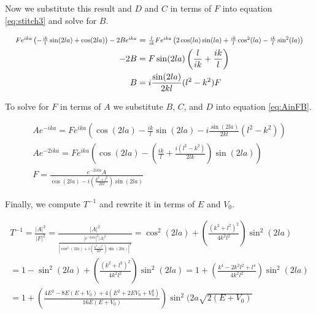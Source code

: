 Now we substitute this result and $D$ and $C$ in terms of $F$ into equation
\eqref{eq:stitch3} and solve for $B$.

\begin{align*}
    \scalebox{0.8}{$
    Fe^{ika}
    \left(
    -\frac{ik}{l}\sin(2la) + \cos(2la)
    \right)
    - 2Be^{ika}
    $}
    &=
    \scalebox{0.8}{$
    \frac{l}{ik}Fe^{ika}
    \left(
    2\cos(la)\sin(la) + \frac{ik}{l}\cos^2(la) - \frac{ik}{l}\sin^2(la)
    \right)
    $}
    \\
    -2B &= F\sin(2la)
    \left(
    \frac{l}{ik} + \frac{ik}{l}
    \right)
    \\
    B &= i\frac{\sin(2la)}{2kl}(l^2 - k^2)F
\end{align*}

To solve for $F$ in terms of $A$ we substitute $B$, $C$, and $D$ into
equation \eqref{eq:AinFB}.

\begin{gather*}
    Ae^{-ika}
    = Fe^{ika}
    \left(
    \cos(2la) - \frac{ik}{l}\sin(2la)
    - i\frac{\sin(2la)}{2kl}(l^2 - k^2)
    \right)
    \\
    Ae^{-2ika}
    = Fe^{ika}
    \left(
    \cos(2la) -
    \left(
    \frac{ik}{l} + \frac{i(l^2 - k^2)}{2lk}
    \right)
    \sin(2la)
    \right)
    \\
    F = \frac{e^{-2ika}A}{\cos(2la) - i
    \left(
    \frac{k^2 + l^2}{2kl}
    \right)
    \sin(2la)}
\end{gather*}

Finally, we compute $T^{-1}$ and rewrite it in terms of $E$ and $V_0$.

\begin{gather*}
    T^{-1} = \frac{\left| A \right| ^{2}}{\left| F \right| ^{2}}
    = \frac{\left| A \right| ^{2}}{
        \frac{\left| e^{-2ika} \right| ^2 \left| A \right | ^2}{
                \left|
                \cos^2(2la) + i \left( \frac{k^2 + l^2}{2kl} \right)
                \sin(2la)
                \right| ^2
            }
        }
    = \cos^2(2la) + \left( \frac{(k^2 + l^2)^2}{4k^2l^2} \right) \sin^2(2la)
    \\
    = 1 - \sin^2(2la) + \left( \frac{(k^2 + l^2)^2}{4k^2l^2}
    \right) \sin^2(2la)
    = 1 + \left( \frac{k^4 - 2k^2l^2 + l^4}{4k^2l^2} \right) \sin^2(2la)
    \\
    = 1 + \left( \frac{4E^2 - 8E(E + V_0) + 4(E^2 + 2EV_0 + V_0^2)}
    {16E(E + V_0)} \right) \sin^2(2a\sqrt{2(E + V_0)}
\end{gather*}

